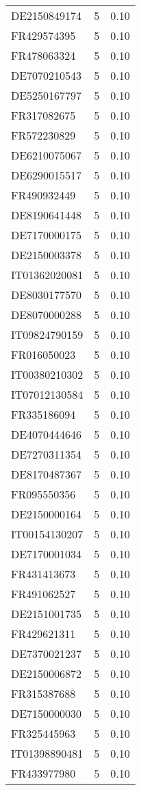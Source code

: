 \begin{table*}[htbp]
\begin{tabular}{lrr}
DE2150849174 & 5 & 0.10 \\
FR429574395 & 5 & 0.10 \\
FR478063324 & 5 & 0.10 \\
DE7070210543 & 5 & 0.10 \\
DE5250167797 & 5 & 0.10 \\
FR317082675 & 5 & 0.10 \\
FR572230829 & 5 & 0.10 \\
DE6210075067 & 5 & 0.10 \\
DE6290015517 & 5 & 0.10 \\
FR490932449 & 5 & 0.10 \\
DE8190641448 & 5 & 0.10 \\
DE7170000175 & 5 & 0.10 \\
DE2150003378 & 5 & 0.10 \\
IT01362020081 & 5 & 0.10 \\
DE8030177570 & 5 & 0.10 \\
DE8070000288 & 5 & 0.10 \\
IT09824790159 & 5 & 0.10 \\
FR016050023 & 5 & 0.10 \\
IT00380210302 & 5 & 0.10 \\
IT07012130584 & 5 & 0.10 \\
FR335186094 & 5 & 0.10 \\
DE4070444646 & 5 & 0.10 \\
DE7270311354 & 5 & 0.10 \\
DE8170487367 & 5 & 0.10 \\
FR095550356 & 5 & 0.10 \\
DE2150000164 & 5 & 0.10 \\
IT00154130207 & 5 & 0.10 \\
DE7170001034 & 5 & 0.10 \\
FR431413673 & 5 & 0.10 \\
FR491062527 & 5 & 0.10 \\
DE2151001735 & 5 & 0.10 \\
FR429621311 & 5 & 0.10 \\
DE7370021237 & 5 & 0.10 \\
DE2150006872 & 5 & 0.10 \\
FR315387688 & 5 & 0.10 \\
DE7150000030 & 5 & 0.10 \\
FR325445963 & 5 & 0.10 \\
IT01398890481 & 5 & 0.10 \\
FR433977980 & 5 & 0.10 \\

\end{tabular}
\end{table*}
